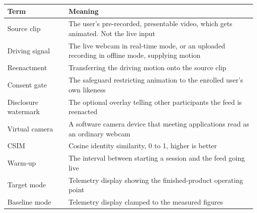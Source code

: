 \documentclass[11pt,a4paper]{report}
\begin{document}
\begin{longtable}{L{3.6cm} L{11.2cm}}
\toprule
\textbf{Term} & \textbf{Meaning} \\
\midrule
\endhead
Source clip & The user's pre-recorded, presentable video, which gets animated.
  Not the live input \\
Driving signal & The live webcam in real-time mode, or an uploaded recording in
  offline mode, supplying motion \\
Reenactment & Transferring the driving motion onto the source clip \\
Consent gate & The safeguard restricting animation to the enrolled user's own
  likeness \\
Disclosure watermark & The optional overlay telling other participants the feed
  is reenacted \\
Virtual camera & A software camera device that meeting applications read as an
  ordinary webcam \\
CSIM & Cosine identity similarity, 0 to 1, higher is better \\
Warm-up & The interval between starting a session and the feed going live \\
Target mode & Telemetry display showing the finished-product operating point \\
Baseline mode & Telemetry display clamped to the measured figures \\
\bottomrule
\end{longtable}
\end{document}
